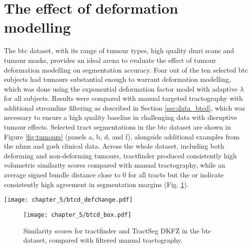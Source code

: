 \section{The effect of deformation modelling}
\label{sec:btcd}

The \gls{btc} dataset, with its range of tumour types, high quality \gls{dmri} scans and tumour masks, provides an ideal arena to evaluate the effect of tumour deformation modelling on segmentation accuracy.
Four out of the ten selected \gls{btc} subjects had tumours substantial enough to warrant deformation modelling, which was done using the exponential deformation factor model with adaptive $\lambda$ for all subjects.
Results were compared with manual targeted tractography with additional streamline filtering as described in Section \ref{sec:data_btcd}, which was necessary to ensure a high quality baseline in challenging data with disruptive tumour effects.
Selected tract segmentations in the \gls{btc} dataset are shown in Figure \ref{fig:tumours} (panels a, b, d, and f), alongside additional examples from the \gls{nhnn} and \gls{gosh} clinical data.
Across the whole dataset, including both deforming and non-deforming tumours, tractfinder produced consistently high volumetric similarity scores compared with manual tractography, while an average signed bundle distance close to 0 for all tracts but the \gls{or} indicate consistently high agreement in segmentation margins (Fig. \ref{fig:btcd_box}).

\begin{SCfigure}[][htb!]
  \texttt{[image: chapter\_5/btcd\_defchange.pdf]}
  \caption{Effect of deformation modelling on segmentation accuracy, compared with manually filtered targeted tractography. Each large datapoint represents the average across tracts for a single subject, and is coloured according to the tumour side. Small datapoints represent individual tracts. In the one subject with a midline tumour, all tracts are considered ipsilateral.}
  \label{fig:btcd_def}
\end{SCfigure}

\begin{figure}[htb!]
  \texttt{[image: chapter\_5/btcd\_box.pdf]}
  \caption{Similarity scores for tractfinder and TractSeg DKFZ in the \gls{btc} dataset, compared with filtered manual tractography.}
  \label{fig:btcd_box}
\end{figure}


